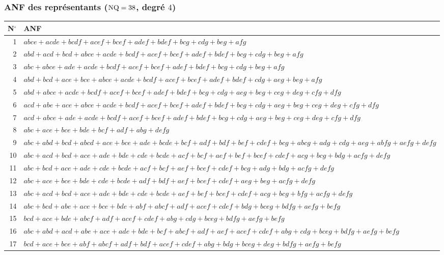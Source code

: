 \subsubsection*{ANF des représentants ($\mathrm{NQ}=38$, degré $4$)}
\begin{longtable}{r p{14.3cm}}
\toprule N$^\circ$ & ANF\\ \midrule
\endhead
1 & {\footnotesize $abce+acde+bcdf+acef+bcef+adef+bdef+bcg+cdg+beg+afg$} \\
2 & {\footnotesize $abd+acd+bcd+abce+acde+bcdf+acef+bcef+adef+bdef+bcg+cdg+beg+afg$} \\
3 & {\footnotesize $abc+abce+ade+acde+bcdf+acef+bcef+adef+bdef+bcg+cdg+beg+afg$} \\
4 & {\footnotesize $abd+bcd+ace+bce+abce+acde+bcdf+acef+bcef+adef+bdef+cdg+aeg+beg+afg$} \\
5 & {\footnotesize $abd+abce+acde+bcdf+acef+bcef+adef+bdef+bcg+cdg+aeg+beg+ceg+deg+cfg+dfg$} \\
6 & {\footnotesize $acd+abe+ace+abce+acde+bcdf+acef+bcef+adef+bdef+bcg+cdg+aeg+beg+ceg+deg+cfg+dfg$} \\
7 & {\footnotesize $acd+abce+ade+acde+bcdf+acef+bcef+adef+bdef+bcg+cdg+aeg+beg+ceg+deg+cfg+dfg$} \\
8 & {\footnotesize $abc+ace+bce+bde+bcf+adf+abg+defg$} \\
9 & {\footnotesize $abc+abd+bcd+abcd+ace+bce+ade+bcde+bcf+adf+bdf+bef+cdef+bcg+abcg+adg+cdg+aeg+abfg+aefg+defg$} \\
10 & {\footnotesize $abc+acd+bcd+ace+ade+bde+cde+bcde+acf+bcf+aef+bef+bcef+cdef+acg+bcg+bdg+acfg+defg$} \\
11 & {\footnotesize $abc+bcd+ace+ade+cde+bcde+acf+bcf+aef+bcef+cdef+bcg+adg+bdg+acfg+defg$} \\
12 & {\footnotesize $abc+ace+bce+bde+cde+bcde+adf+bdf+aef+bcef+cdef+aeg+beg+acfg+defg$} \\
13 & {\footnotesize $abc+acd+bcd+ace+ade+bde+cde+bcde+aef+bef+bcef+cdef+acg+bcg+bfg+acfg+defg$} \\
14 & {\footnotesize $abc+bcd+abe+ace+bce+bde+abf+abcf+adf+acef+cdef+bdg+bceg+bdfg+aefg+befg$} \\
15 & {\footnotesize $bcd+ace+bde+abcf+adf+acef+cdef+abg+cdg+bceg+bdfg+aefg+befg$} \\
16 & {\footnotesize $abc+abd+acd+abe+ace+ade+bde+bcf+abcf+adf+aef+acef+cdef+abg+cdg+bceg+bdfg+aefg+befg$} \\
17 & {\footnotesize $bcd+ace+bce+abf+abcf+adf+bdf+acef+cdef+abg+bdg+bceg+deg+bdfg+aefg+befg$} \\

\end{longtable}
